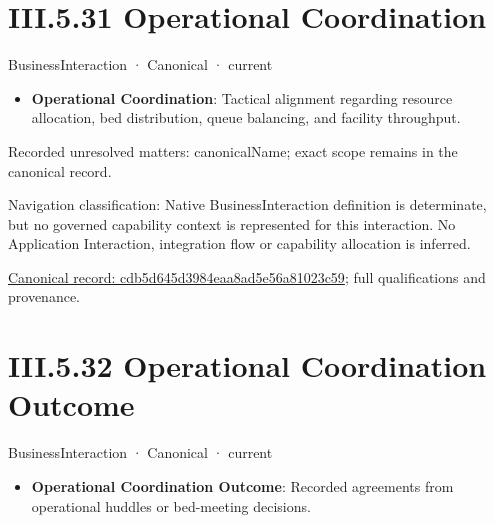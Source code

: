 \section*{III.5.31 Operational Coordination}
\label{navigation:III.5.31}

\label{element:cdb5d645d3984eaa8ad5e56a81023c59}
{\small BusinessInteraction · Canonical · current}\par

\begin{itemize}


\item \textbf{Operational Coordination}: Tactical alignment regarding resource allocation, bed distribution, queue balancing, and facility throughput.

\end{itemize}

{\small Recorded unresolved matters: canonicalName; exact scope remains in the canonical record.}\par
{\small Navigation classification: Native BusinessInteraction definition is determinate, but no governed capability context is represented for this interaction. No Application Interaction, integration flow or capability allocation is inferred.}\par
{\footnotesize \href{../../../../../../../continuum/business/business-interaction/cdb5d645d3984eaa8ad5e56a81023c59.md}{Canonical record: cdb5d645d3984eaa8ad5e56a81023c59}; full qualifications and provenance.}\par
\section*{III.5.32 Operational Coordination Outcome}
\label{navigation:III.5.32}

\label{element:d40c5ee0dbaa450dab073103f25ded6d}
{\small BusinessInteraction · Canonical · current}\par

\begin{itemize}


\item \textbf{Operational Coordination Outcome}: Recorded agreements from operational huddles or bed-meeting decisions.

\end{itemize}

